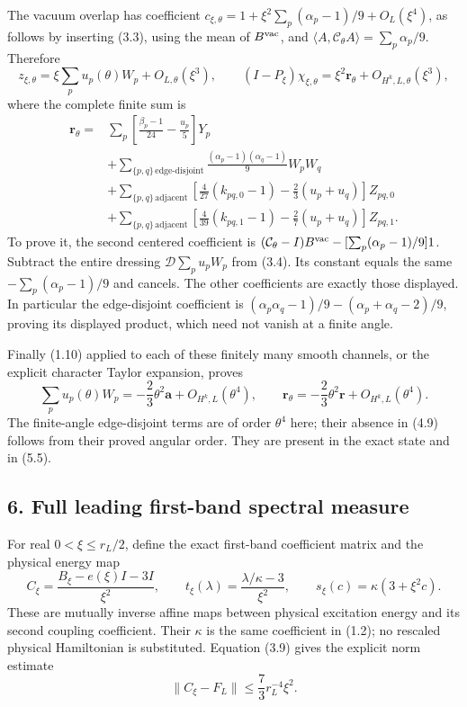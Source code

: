 \documentclass[
  11pt,
]{article}
\begin{document}
The vacuum overlap has coefficient
\(c_{\xi,\theta}=1+\xi^2\sum_p(\alpha_p-1)/9+O_L(\xi^4)\), as follows by
inserting (3.3), using the mean of \(B^{\rm vac}\), and
\(\langle A,\mathcal C_\theta A\rangle=\sum_p\alpha_p/9\). Therefore \[
 z_{\xi,\theta}=\xi\sum_pu_p(\theta)W_p+O_{L,\theta}(\xi^3),
 \qquad
 (I-P_\xi)\chi_{\xi,\theta}
       =\xi^2\mathbf r_\theta+O_{H^k,L,\theta}(\xi^3),
\tag{5.4}
\] where the complete finite sum is \[
\begin{split}
 \mathbf r_\theta={}&
 \sum_p\left[\frac{\beta_p-1}{24}-\frac{u_p}{5}\right]Y_p\\
 &+\sum_{\{p,q\}\,\text{edge-disjoint}}
       \frac{(\alpha_p-1)(\alpha_q-1)}9 W_pW_q\\
 &+\sum_{\{p,q\}\,\text{adjacent}}
   \left[\frac4{27}(k_{pq,0}-1)-\frac23(u_p+u_q)\right]Z_{pq,0}\\
 &+\sum_{\{p,q\}\,\text{adjacent}}
   \left[\frac4{39}(k_{pq,1}-1)-\frac27(u_p+u_q)\right]Z_{pq,1}.
\end{split}
\tag{5.5}
\] To prove it, the second centered coefficient is
\((\mathcal C_\theta-I)B^{\rm vac}
 -[\sum_p(\alpha_p-1)/9]1\). Subtract the entire dressing
\(\mathscr D\sum_pu_pW_p\) from (3.4). Its constant equals the same
\(-\sum_p(\alpha_p-1)/9\) and cancels. The other coefficients are
exactly those displayed. In particular the edge-disjoint coefficient is
\((\alpha_p\alpha_q-1)/9-(\alpha_p+\alpha_q-2)/9\), proving its
displayed product, which need not vanish at a finite angle.

Finally (1.10) applied to each of these finitely many smooth channels,
or the explicit character Taylor expansion, proves \[
 \sum_pu_p(\theta)W_p=-\frac23\theta^2\mathbf a+O_{H^k,L}(\theta^4),
 \qquad \mathbf r_\theta=-\frac23\theta^2\mathbf r+O_{H^k,L}(\theta^4).
\tag{5.6}
\] The finite-angle edge-disjoint terms are of order \(\theta^4\) here;
their absence in (4.9) follows from their proved angular order. They are
present in the exact state and in (5.5).

\subsection{6. Full leading first-band spectral
measure}\label{magnetic-part-9-full-leading-first-band-spectral-measure}

For real \(0<\xi\le r_L/2\), define the exact first-band coefficient
matrix and the physical energy map \[
 C_\xi=\frac{B_\xi-e(\xi)I-3I}{\xi^2},\qquad
 t_\xi(\lambda)=\frac{\lambda/\kappa-3}{\xi^2},\qquad
 s_\xi(c)=\kappa(3+\xi^2c).
\tag{6.1}
\] These are mutually inverse affine maps between physical excitation
energy and its second coupling coefficient. Their \(\kappa\) is the same
coefficient in (1.2); no rescaled physical Hamiltonian is substituted.
Equation (3.9) gives the explicit norm estimate \[
 \|C_\xi-F_L\|\le\frac73r_L^{-4}\xi^2.
\tag{6.2}
\]
\end{document}
